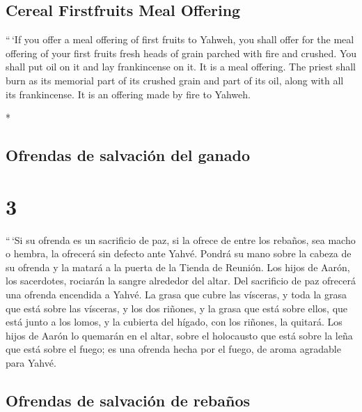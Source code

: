 \begin{paracol}{2}
\begin{otherlanguage}{english}
\hypertarget{cereal-firstfruits-meal-offering}{%
\subsection{Cereal Firstfruits Meal
Offering}\label{cereal-firstfruits-meal-offering}}

 ``\,`If you offer a meal offering of first fruits to
Yahweh, you shall offer for the meal offering of your first fruits fresh
heads of grain parched with fire and crushed.  You shall
put oil on it and lay frankincense on it. It is a meal offering.
 The priest shall burn as its memorial part of its
crushed grain and part of its oil, along with all its frankincense. It
is an offering made by fire to Yahweh.

\end{otherlanguage}

\switchcolumn[0]*

\hypertarget{ofrendas-de-salvaciuxf3n-del-ganado}{%
\subsection{Ofrendas de salvación del
ganado}\label{ofrendas-de-salvaciuxf3n-del-ganado}}

\hypertarget{section-4}{%
\section{3}\label{section-4}}

 ``\,`Si su ofrenda es un sacrificio de paz, si la ofrece
de entre los rebaños, sea macho o hembra, la ofrecerá sin defecto ante
Yahvé.  Pondrá su mano sobre la cabeza de su ofrenda y la
matará a la puerta de la Tienda de Reunión. Los hijos de Aarón, los
sacerdotes, rociarán la sangre alrededor del altar.  Del
sacrificio de paz ofrecerá una ofrenda encendida a Yahvé. La grasa que
cubre las vísceras, y toda la grasa que está sobre las vísceras,
 y los dos riñones, y la grasa que está sobre ellos, que
está junto a los lomos, y la cubierta del hígado, con los riñones, la
quitará.  Los hijos de Aarón lo quemarán en el altar,
sobre el holocausto que está sobre la leña que está sobre el fuego; es
una ofrenda hecha por el fuego, de aroma agradable para Yahvé.

\hypertarget{ofrendas-de-salvaciuxf3n-de-rebauxf1os}{%
\subsection{Ofrendas de salvación de
rebaños}\label{ofrendas-de-salvaciuxf3n-de-rebauxf1os}}


\end{paracol}
